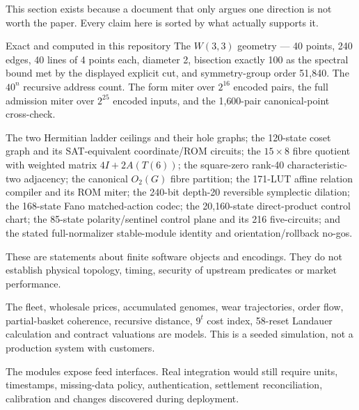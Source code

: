 \documentclass[11pt,letterpaper]{article}
\newcommand{\W}{\ensuremath{W(3,3)}}
\begin{document}
This section exists because a document that only argues one direction is not
worth the paper. Every claim here is sorted by what actually supports it.

\begin{keybox}{Exact and computed in this repository}
The \W{} geometry --- 40 points, 240 edges, 40 lines of 4 points each, diameter
2, bisection exactly 100 as the spectral bound met by the displayed explicit
cut, and symmetry-group order 51{,}840. The $40^n$ recursive address count. The
form miter over $2^{16}$ encoded pairs, the full admission miter over $2^{25}$
encoded inputs, and the 1{,}600-pair canonical-point cross-check.

The two Hermitian ladder ceilings and their hole graphs; the 120-state coset
graph and its SAT-equivalent coordinate/ROM circuits; the $15\times8$ fibre
quotient with weighted matrix $4I+2A(T(6))$; the square-zero rank-40
characteristic-two adjacency; the canonical $O_2(G)$ fibre partition; the
171-LUT affine relation compiler and its ROM miter; the 240-bit depth-20
reversible symplectic dilation; the 168-state Fano matched-action codec; the
20,160-state direct-product control chart; the 85-state polarity/sentinel
control plane and its 216 five-circuits; and the stated full-normalizer
stable-module identity and orientation/rollback no-gos.

\vspace{4pt}
These are statements about finite software objects and encodings. They do not
establish physical topology, timing, security of upstream predicates or market
performance.
\end{keybox}

\begin{warnbox}
The fleet, wholesale prices, accumulated genomes, wear trajectories, order flow,
partial-basket coherence, recursive distance, $9^t$ cost index, 58-reset
Landauer calculation and contract valuations are models. This is a seeded
simulation, not a production system with customers.

\vspace{4pt}
The modules expose feed interfaces. Real integration would still require units,
timestamps, missing-data policy, authentication, settlement reconciliation,
calibration and changes discovered during deployment.
\end{warnbox}
\end{document}
